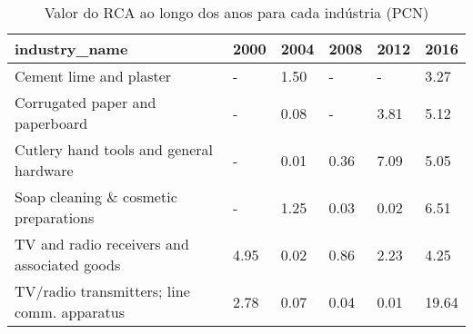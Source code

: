 \begin{table}
\centering
\caption{Valor do RCA ao longo dos anos para cada indústria (PCN)}
\begin{tabular}{p{6cm}p{1.5cm}p{1.5cm}p{1.5cm}p{1.5cm}p{1.5cm}}
\toprule
                              industry\_name & 2000 & 2004 & 2008 & 2012 &  2016 \\
\midrule
                    Cement lime and plaster &    - & 1.50 &    - &    - &  3.27 \\
            Corrugated paper and paperboard &    - & 0.08 &    - & 3.81 &  5.12 \\
    Cutlery hand tools and general hardware &    - & 0.01 & 0.36 & 7.09 &  5.05 \\
      Soap cleaning \& cosmetic preparations &    - & 1.25 & 0.03 & 0.02 &  6.51 \\
TV and radio receivers and associated goods & 4.95 & 0.02 & 0.86 & 2.23 &  4.25 \\
TV/radio transmitters; line comm. apparatus & 2.78 & 0.07 & 0.04 & 0.01 & 19.64 \\
\bottomrule
\end{tabular}
\end{table}
